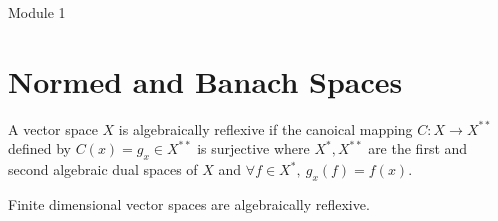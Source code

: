 
\setcounter{section}{3}
{\Large Module 1}
\section{Normed and Banach Spaces}
\begin{commentary}
\begin{description}
	\item[Algebraically Reflexive]
		A vector space $X$ is algebraically reflexive if the canoical mapping $C : X \to X^{\ast\ast}$ defined by $C(x) = g_x \in X^{\ast\ast}$ is surjective where $X^\ast, X^{\ast\ast}$ are the first and second algebraic dual spaces of $X$ and $\forall f \in X^\ast,\ g_x(f) = f(x)$.\cite[\S2.8]{Kreyszig}\\

	\item Finite dimensional vector spaces are algebraically reflexive.\cite[\S2.9.3]{Kreyszig}
\end{description}
\end{commentary}

